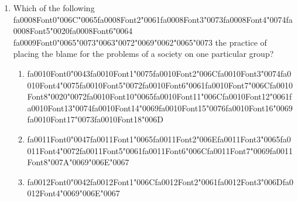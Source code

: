 \documentclass[12pt]{article}
\begin{document}
\begin{enumerate}[label=\arabic*.]
\begin{enumerate}[label=(\alph*)]
    \item a {\csname fa0006Font0\endcsname\char"006D}{\csname fa0006Font1\endcsname\char"0061}{\csname fa0006Font2\endcsname\char"0072}{\csname fa0006Font3\endcsname\char"006B}{\csname fa0006Font4\endcsname\char"0065}{\csname fa0006Font5\endcsname\char"0074} {\csname fa0007Font0\endcsname\char"002D}{\csname fa0007Font1\endcsname\char"0064}{\csname fa0007Font2\endcsname\char"0072}{\csname fa0007Font3\endcsname\char"0069}{\csname fa0007Font4\endcsname\char"0076}{\char"0065}{\csname fa0007Font6\endcsname\char"006E} economy
\end{enumerate}
\item Which of the following {\csname fa0008Font0\endcsname\char"006C}{\char"0065}{\csname fa0008Font2\endcsname\char"0061}{\csname fa0008Font3\endcsname\char"0073}{\csname fa0008Font4\endcsname\char"0074}{\csname fa0008Font5\endcsname\char"0020}{\csname fa0008Font6\endcsname\char"0064} {\csname fa0009Font0\endcsname\char"0065}{\char"0073}{\char"0063}{\char"0072}{\char"0069}{\char"0062}{\char"0065}{\char"0073} the practice of placing the blame for the problems of a society on one particular group?
\begin{enumerate}[label=(\alph*)]
    \item {\csname fa0010Font0\endcsname\char"0043}{\csname fa0010Font1\endcsname\char"0075}{\csname fa0010Font2\endcsname\char"006C}{\csname fa0010Font3\endcsname\char"0074}{\csname fa0010Font4\endcsname\char"0075}{\csname fa0010Font5\endcsname\char"0072}{\csname fa0010Font6\endcsname\char"0061}{\csname fa0010Font7\endcsname\char"006C}{\csname fa0010Font8\endcsname\char"0020}{\char"0072}{\csname fa0010Font10\endcsname\char"0065}{\csname fa0010Font11\endcsname\char"006C}{\csname fa0010Font12\endcsname\char"0061}{\csname fa0010Font13\endcsname\char"0074}{\csname fa0010Font14\endcsname\char"0069}{\csname fa0010Font15\endcsname\char"0076}{\csname fa0010Font16\endcsname\char"0069}{\csname fa0010Font17\endcsname\char"0073}{\csname fa0010Font18\endcsname\char"006D}
    \item {\csname fa0011Font0\endcsname\char"0047}{\csname fa0011Font1\endcsname\char"0065}{\csname fa0011Font2\endcsname\char"006E}{\csname fa0011Font3\endcsname\char"0065}{\csname fa0011Font4\endcsname\char"0072}{\csname fa0011Font5\endcsname\char"0061}{\csname fa0011Font6\endcsname\char"006C}{\csname fa0011Font7\endcsname\char"0069}{\csname fa0011Font8\endcsname\char"007A}{\char"0069}{\char"006E}{\char"0067}
    \item {\csname fa0012Font0\endcsname\char"0042}{\csname fa0012Font1\endcsname\char"006C}{\csname fa0012Font2\endcsname\char"0061}{\csname fa0012Font3\endcsname\char"006D}{\csname fa0012Font4\endcsname\char"0069}{\char"006E}{\char"0067}

\end{enumerate}
\end{enumerate}
\end{document}

